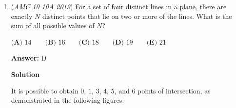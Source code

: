 \begin{enumerate}
 



\textbf{Solution 7 (Properties of an isosceles triangle)}

$\angle{BEC}=90$ (Thales Theorem)

 $\angle{BEC} \text{ bisects } \angle{ACB}$ (Properties of the altitude of an isosceles triangle) 

 $\angle{ECD}=20$
$\angle{BDC}=90$ (Thales Theorem)

 $\angle{CFD} = 180 - 90 - 20 = 70$ (Interior angles of a triangle)

 $\boxed{\angle{BFC} = 110}$ (Linear Pair)

 



\textbf{Solution 8 (Simple Angle Chasing)}

We know $\measuredangle{ACB}=40$, so by the properties of isosceles triangles, $\measuredangle{ABC}=70$. $CDEB$ is a cyclic quadrilateral, so $\measuredangle{DEB}=180-\measuredangle{DCB}=180-\measuredangle{ACB}=140$, and similarly we get $\measuredangle{CDE}=110$. We know $\measuredangle{CDB}=90$ by the inscribed angle theorem and because it is an angle that terminates in a diameter of the circle, so the intercepted arc has measure $180$.Similarly, we know $\measuredangle{CEB}=90$. Therefore, $\measuredangle{BDE}=\measuredangle{CDE}-90=20$, and by similar methods $\measuredangle{DEC}=50$. Looking at $\triangle{DEF}$, we see that $\measuredangle{DFE}=110$, and by vertical angles, we see that $\boxed{\measuredangle{BFC}=110}$

 - SumDumNerd

 Education, the Study of Everything

 


	\item (\textit{AMC 10 10A 2019}) For a set of four distinct lines in a plane, there are exactly $N$ distinct points that lie on two or more of the lines. What is the sum of all possible values of $N$?


 $\textbf{(A) } 14 \qquad \textbf{(B) } 16 \qquad \textbf{(C) } 18 \qquad \textbf{(D) } 19 \qquad \textbf{(E) } 21$

 \textbf{Answer: }D



\textbf{Solution}

It is possible to obtain $0$, $1$, $3$, $4$, $5$, and $6$ points of intersection, as demonstrated in the following figures:

 


\end{enumerate}
